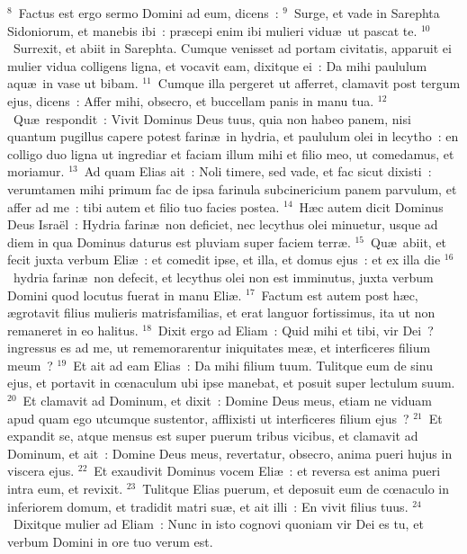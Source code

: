 ${}^{8}$~Factus est ergo sermo Domini ad eum, dicens~:
${}^{9}$~Surge, et vade in Sarephta Sidoniorum, et manebis ibi~: pr\ae cepi enim ibi mulieri vidu\ae\ ut pascat te.
${}^{10}$~Surrexit, et abiit in Sarephta. Cumque venisset ad portam civitatis, apparuit ei mulier vidua colligens ligna, et vocavit eam, dixitque ei~: Da mihi paululum aqu\ae\ in vase ut bibam.
${}^{11}$~Cumque illa pergeret ut afferret, clamavit post tergum ejus, dicens~: Affer mihi, obsecro, et buccellam panis in manu tua.
${}^{12}$~Qu\ae\ respondit~: Vivit Dominus Deus tuus, quia non habeo panem, nisi quantum pugillus capere potest farin\ae\ in hydria, et paululum olei in lecytho~: en colligo duo ligna ut ingrediar et faciam illum mihi et filio meo, ut comedamus, et moriamur.
${}^{13}$~Ad quam Elias ait~: Noli timere, sed vade, et fac sicut dixisti~: verumtamen mihi primum fac de ipsa farinula subcinericium panem parvulum, et affer ad me~: tibi autem et filio tuo facies postea.
${}^{14}$~H\ae c autem dicit Dominus Deus Isra\"el~: Hydria farin\ae\ non deficiet, nec lecythus olei minuetur, usque ad diem in qua Dominus daturus est pluviam super faciem terr\ae .
${}^{15}$~Qu\ae\ abiit, et fecit juxta verbum Eli\ae~: et comedit ipse, et illa, et domus ejus~: et ex illa die
${}^{16}$~hydria farin\ae\ non defecit, et lecythus olei non est imminutus, juxta verbum Domini quod locutus fuerat in manu Eli\ae .
${}^{17}$~Factum est autem post h\ae c, \ae grotavit filius mulieris matrisfamilias, et erat languor fortissimus, ita ut non remaneret in eo halitus.
${}^{18}$~Dixit ergo ad Eliam~: Quid mihi et tibi, vir Dei~? ingressus es ad me, ut rememorarentur iniquitates me\ae , et interficeres filium meum~?
${}^{19}$~Et ait ad eam Elias~: Da mihi filium tuum. Tulitque eum de sinu ejus, et portavit in cœnaculum ubi ipse manebat, et posuit super lectulum suum.
${}^{20}$~Et clamavit ad Dominum, et dixit~: Domine Deus meus, etiam ne viduam apud quam ego utcumque sustentor, afflixisti ut interficeres filium ejus~?
${}^{21}$~Et expandit se, atque mensus est super puerum tribus vicibus, et clamavit ad Dominum, et ait~: Domine Deus meus, revertatur, obsecro, anima pueri hujus in viscera ejus.
${}^{22}$~Et exaudivit Dominus vocem Eli\ae~: et reversa est anima pueri intra eum, et revixit.
${}^{23}$~Tulitque Elias puerum, et deposuit eum de cœnaculo in inferiorem domum, et tradidit matri su\ae , et ait illi~: En vivit filius tuus.
${}^{24}$~Dixitque mulier ad Eliam~: Nunc in isto cognovi quoniam vir Dei es tu, et verbum Domini in ore tuo verum est.

